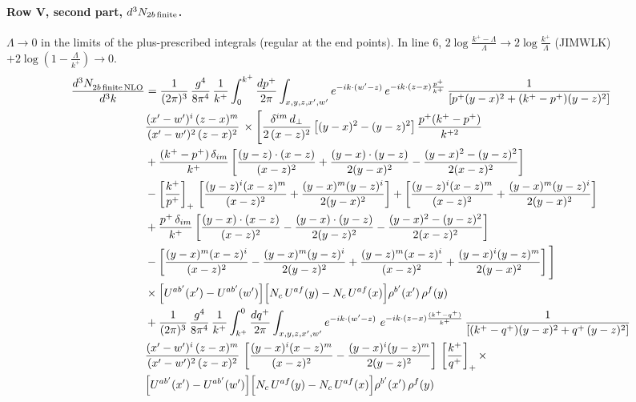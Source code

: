 \documentclass[10pt]{article}
\numberwithin{equation}{section}
\begin{document}
\paragraph{Row V, second part, $d^3N_{2b\,\rm finite}$.}
$\Lambda\to0$ in the limits of the plus-prescribed integrals (regular at the end points). In line 6, $2\log\frac{k^+-\Lambda}{\Lambda}\to2\log\frac{k^+}{\Lambda}$ (JIMWLK) $+2\log(1-\frac{\Lambda}{k^+})\to0$.
\begin{align}
    \frac{d^{3}N_{2b\,\rm finite\, NLO}^{\rm}}{d^{3}k} & =  \frac{1}{(2\pi)^{3}}\,\frac{g^{4}}{8\pi^{4}}\,\frac{1}{k^{+}}\int_{0}^{k^{+}}\frac{dp^{+}}{2\pi}\int_{x,y,z,x',w'}e^{-ik\cdot(w'-z)}\,e^{-ik\cdot(z-x)\frac{p^{+}}{k^{+}}}\,\frac{1}{\left[p^{+}(y-x)^{2}+(k^{+}-p^{+})(y-z)^{2}\right]}\notag \\ & \frac{(x'-w')^{i}\,(z-x)^{m}}{(x'-w')^{2}\,(z-x)^{2}}\,\times\Bigg[\frac{\delta^{im}\,d_{\perp}}{2\,(x-z)^{2}}\left[(y-x)^{2}-(y-z)^{2}\right]\frac{p^{+}(k^{+}-p^{+})}{k^{+2}}
\notag \\ & +\frac{(k^{+}-p^{+})\,\delta_{im}}{k^{+}}\left[\frac{(y-z)\cdot(x-z)}{(x-z)^{2}}+\frac{(y-x)\cdot(y-z)}{2(y-x)^{2}}-\frac{(y-x)^{2}-(y-z)^{2}}{2(x-z)^{2}}\right]\notag\\
&-\left[\frac{k^{+}}{p^{+}}\right]_{+}\,\left[\frac{(y-z)^{i}(x-z)^{m}}{(x-z)^{2}}+\frac{(y-x)^{m}(y-z)^{i}}{2(y-x)^{2}}\right]+\left[\frac{(y-z)^{i}(x-z)^{m}}{(x-z)^{2}}+\frac{(y-x)^{m}(y-z)^{i}}{2(y-x)^{2}}\right]\notag\\
&+\frac{p^{+}\,\delta_{im}}{k^{+}}\left[\frac{(y-x)\cdot(x-z)}{(x-z)^{2}}-\frac{(y-x)\cdot(y-z)}{2(y-z)^{2}}-\frac{(y-x)^{2}-(y-z)^{2}}{2(x-z)^{2}}\right]\notag\\
&-\left[\frac{(y-x)^{m}(x-z)^{i}}{(x-z)^{2}}-\frac{(y-x)^{m}(y-z)^{i}}{2(y-z)^{2}}+\frac{(y-z)^{m}(x-z)^{i}}{(x-z)^{2}}+\frac{(y-x)^{i}(y-z)^{m}}{2(y-x)^{2}}\right]\Bigg]\notag\\
&\times\Big[U^{ab'}(x')-U^{ab'}(w')\Big]\Big[N_{c}\,U^{af}(y)-N_{c}\,U^{af}(x)\Big]\rho^{b'}(x')\,\rho^{f}(y) \notag \\
& + \frac{1}{(2\pi)^{3}}\,\frac{g^{4}}{8\pi^{4}}\,\frac{1}{k^{+}}\int_{k^{+}}^{0}\frac{dq^{+}}{2\pi}\int_{x,y,z,x',w'}e^{-ik\cdot(w'-z)}\ e^{-ik\cdot(z-x)\frac{(k^{+}-q^{+})}{k^{+}}}\,\frac{1}{\left[(k^{+}-q^{+})(y-x)^{2}+q^{+}\,(y-z)^{2}\right]}\notag \\ & \frac{(x'-w')^{i}\,(z-x)^{m}}{(x'-w')^{2}\,(z-x)^{2}}\,\left[\frac{(y-x)^{i}(x-z)^{m}}{(x-z)^{2}}-\frac{(y-x)^{i}(y-z)^{m}}{2(y-z)^{2}}\right]\,\left[\frac{k^{+}}{q^{+}}\right]_{+}\times\notag \\ & \Big[U^{ab'}(x')-U^{ab'}(w')\Big]\Big[N_{c}\,U^{af}(y)-N_{c}\,U^{af}(x)\Big]\rho^{b'}(x')\,\rho^{f}(y) \notag \\

\end{align}
\end{document}
